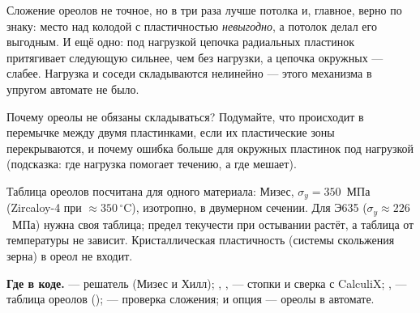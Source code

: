 \begin{idea}
Сложение ореолов не точное, но в три раза лучше потолка и, главное, верно по знаку: место над
колодой с пластичностью \emph{невыгодно}, а потолок делал его выгодным. И ещё одно: под нагрузкой
цепочка радиальных пластинок притягивает следующую сильнее, чем без нагрузки, а цепочка окружных ---
слабее. Нагрузка и соседи складываются нелинейно --- этого механизма в упругом автомате не было.
\end{idea}

\begin{exercise}
Почему ореолы не обязаны складываться? Подумайте, что происходит в перемычке между двумя
пластинками, если их пластические зоны перекрываются, и почему ошибка больше для окружных
пластинок под нагрузкой (подсказка: где нагрузка помогает течению, а где мешает).
\end{exercise}

\begin{warnbox}
Таблица ореолов посчитана для одного материала: Мизес, $\sigma_y=350$~МПа (Zircaloy-4 при
$\approx350\,^\circ$C), изотропно, в двумерном сечении. Для Э635 ($\sigma_y\approx226$~МПа) нужна
своя таблица; предел текучести при остывании растёт, а таблица от температуры не зависит.
Кристаллическая пластичность (системы скольжения зерна) в ореол не входит.
\end{warnbox}

\begin{codebox}
\textbf{Где в коде.}  --- решатель (Мизес и Хилл); ,
,  --- стопки и сверка с CalculiX;
,  --- таблица ореолов ();
 --- проверка сложения;  и опция  --- ореолы в автомате.
\end{codebox}
